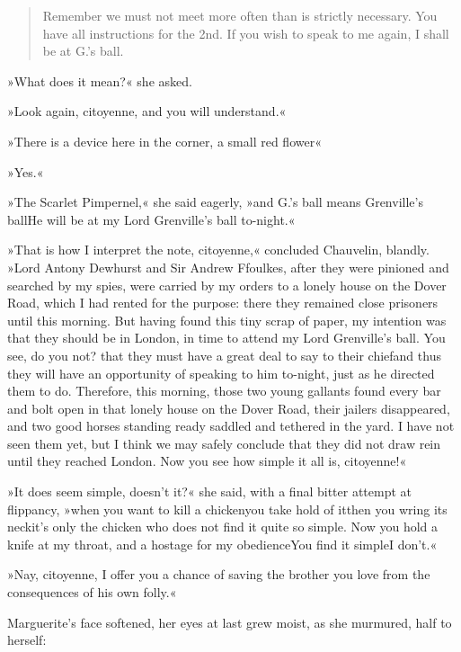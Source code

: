 \blockquote{Remember we must not meet more often than is strictly necessary. You have all instructions for the 2nd. If you wish to speak to me again, I shall be at G.'s ball.}

»What does it mean?« she asked.

»Look again, citoyenne, and you will understand.«

»There is a device here in the corner, a small red flower\textellipsis«

»Yes.«

»The Scarlet Pimpernel,« she said eagerly, »and G.'s ball means Grenville's ball\textellipsis \allowbreak  He will be at my Lord Grenville's ball to-night.«

»That is how I interpret the note, citoyenne,« concluded Chauve\-lin, blandly. »Lord Antony Dewhurst and Sir Andrew Ffoulkes, after they were pinioned and searched by my spies, were carried by my orders to a lonely house on the Dover Road, which I had rented for the purpose: there they remained close prisoners until this morning. But having found this tiny scrap of paper, my intention was that they should be in London, in time to attend my Lord Grenville's ball. You see, do you not? that they must have a great deal to say to their chief\textellipsis \allowbreak  and thus they will have an opportunity of speaking to him to-night, just as he directed them to do. Therefore, this morning, those two young gallants found every bar and bolt open in that lonely house on the Dover Road, their jailers disappeared, and two good horses standing ready saddled and tethered in the yard. I have not seen them yet, but I think we may safely conclude that they did not draw rein until they reached London. Now you see how simple it all is, citoyenne!«

»It does seem simple, doesn't it?« she said, with a final bitter attempt at flippancy, »when you want to kill a chicken\textellipsis \allowbreak  you take hold of it\textellipsis \allowbreak  then you wring its neck\textellipsis \allowbreak  it's only the chicken who does not find it quite so simple. Now you hold a knife at my throat, and a hostage for my obedience\textellipsis \allowbreak  You find it simple\textellipsis \allowbreak  I don't.«

»Nay, citoyenne, I offer you a chance of saving the brother you love from the consequences of his own folly.«

Marguerite's face softened, her eyes at last grew moist, as she murmured, half to herself:

